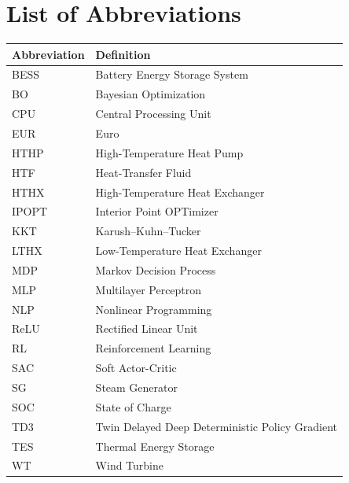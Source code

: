 \documentclass[12pt]{article}
\newcommand{\startnewpage}{\clearpage}
\begin{document}
\section*{List of Abbreviations}
\begingroup
\renewcommand{\arraystretch}{1.2}
\begin{tabular}{@{}p{}p{}@{}}
\textbf{Abbreviation} & \textbf{Definition} \\
\hline
BESS  & Battery Energy Storage System \\
BO    & Bayesian Optimization \\
CPU   & Central Processing Unit \\
EUR   & Euro \\
HTHP  & High-Temperature Heat Pump \\
HTF   & Heat-Transfer Fluid \\
HTHX  & High-Temperature Heat Exchanger \\
IPOPT & Interior Point OPTimizer \\
KKT   & Karush--Kuhn--Tucker \\
LTHX  & Low-Temperature Heat Exchanger \\
MDP   & Markov Decision Process \\
MLP   & Multilayer Perceptron \\
NLP   & Nonlinear Programming \\
ReLU  & Rectified Linear Unit \\
RL    & Reinforcement Learning \\
SAC   & Soft Actor-Critic \\
SG    & Steam Generator \\
SOC   & State of Charge \\
TD3   & Twin Delayed Deep Deterministic Policy Gradient \\
TES   & Thermal Energy Storage \\
WT    & Wind Turbine \\
\end{tabular}
\endgroup

\clearpage
\setcounter{table}{-1}


\startnewpage
{}



\end{document}
